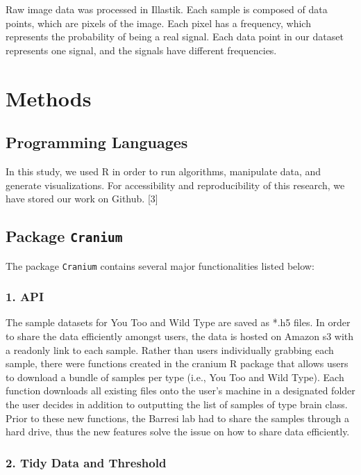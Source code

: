 \documentclass[10pt,letterpaper]{article}
\begin{document}
Raw image data was processed in Illastik. Each sample is composed of
data points, which are pixels of the image. Each pixel has a frequency,
which represents the probability of being a real signal. Each data point
in our dataset represents one signal, and the signals have different
frequencies.

\section{Methods}\label{methods}

\subsection{Programming Languages}\label{programming-languages}

In this study, we used R in order to run algorithms, manipulate data,
and generate visualizations. For accessibility and reproducibility of
this research, we have stored our work on Github. {[}3{]}

\subsection{\texorpdfstring{Package
\texttt{Cranium}}{Package Cranium}}\label{package-cranium}

The package \texttt{Cranium} contains several major functionalities
listed below:

\subsubsection{1. API}\label{api}

The sample datasets for You Too and Wild Type are saved as *.h5 files.
In order to share the data efficiently amongst users, the data is hosted
on Amazon s3 with a readonly link to each sample. Rather than users
individually grabbing each sample, there were functions created in the
cranium R package that allows users to download a bundle of samples per
type (i.e., You Too and Wild Type). Each function downloads all existing
files onto the user's machine in a designated folder the user decides in
addition to outputting the list of samples of type brain class. Prior to
these new functions, the Barresi lab had to share the samples through a
hard drive, thus the new features solve the issue on how to share data
efficiently.

\subsubsection{2. Tidy Data and
Threshold}\label{tidy-data-and-threshold}
\end{document}
